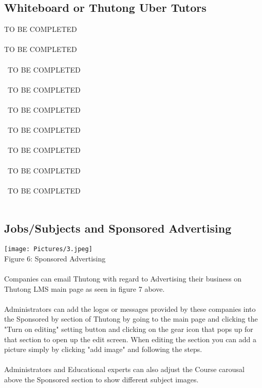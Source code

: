 \documentclass[english]{article}
\begin{document}
\subsection{Whiteboard or Thutong Uber Tutors}

TO BE COMPLETED\\\\
TO BE COMPLETED\\\\\
TO BE COMPLETED\\\\\
TO BE COMPLETED\\\\\
TO BE COMPLETED\\\\\
TO BE COMPLETED\\\\\
TO BE COMPLETED\\\\\
TO BE COMPLETED\\\\\
TO BE COMPLETED\\\\

\subsection{Jobs/Subjects and Sponsored Advertising}

\texttt{[image: Pictures/3.jpeg]} \\
Figure 6: Sponsored Advertising \\\\
Companies can email Thutong with regard to Advertising their business on Thutong LMS main page as seen in figure 7 above.\\\\
Administrators can add the logos or messages provided by these companies into the Sponsored by section of Thutong by going to the main page and clicking the "Turn on editing" setting button and clicking on the gear icon that pops up for that section to open up the edit screen. When editing the section you can add a picture simply by clicking "add image" and following the steps. \\\\
Administrators and Educational experts can also adjust the Course carousal above the Sponsored section to show different subject images.
\end{document}
